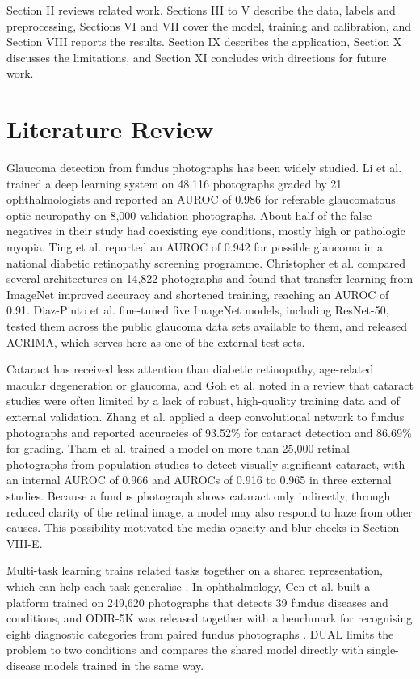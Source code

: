 \documentclass[conference,a4paper]{IEEEtran}
\begin{document}
Section II reviews related work. Sections III to V describe the data, labels and preprocessing,
Sections VI and VII cover the model, training and calibration, and Section VIII reports the results.
Section IX describes the application, Section X discusses the limitations, and Section XI concludes
with directions for future work.

\section{Literature Review}

Glaucoma detection from fundus photographs has been widely studied. Li et al. \cite{ref6} trained a
deep learning system on 48,116 photographs graded by 21 ophthalmologists and reported an AUROC of
0.986 for referable glaucomatous optic neuropathy on 8,000 validation photographs. About half of the
false negatives in their study had coexisting eye conditions, mostly high or pathologic myopia. Ting
et al. \cite{ref5} reported an AUROC of 0.942 for possible glaucoma in a national diabetic
retinopathy screening programme. Christopher et al. \cite{ref11} compared several architectures on
14,822 photographs and found that transfer learning from ImageNet improved accuracy and shortened
training, reaching an AUROC of 0.91. Diaz-Pinto et al. \cite{ref12} fine-tuned five ImageNet models,
including ResNet-50, tested them across the public glaucoma data sets available to them, and
released ACRIMA, which serves here as one of the external test sets.

Cataract has received less attention than diabetic retinopathy, age-related macular degeneration or
glaucoma, and Goh et al. \cite{ref8} noted in a review that cataract studies were often limited by a
lack of robust, high-quality training data and of external validation. Zhang et al. \cite{ref13}
applied a deep convolutional network to fundus photographs and reported accuracies of 93.52\% for
cataract detection and 86.69\% for grading. Tham et al. \cite{ref2} trained a model on more than
25,000 retinal photographs from population studies to detect visually significant cataract, with an
internal AUROC of 0.966 and AUROCs of 0.916 to 0.965 in three external studies. Because a fundus
photograph shows cataract only indirectly, through reduced clarity of the retinal image, a model may
also respond to haze from other causes. This possibility motivated the media-opacity and blur checks
in Section VIII-E.

Multi-task learning trains related tasks together on a shared representation, which can help each
task generalise \cite{ref14}. In ophthalmology, Cen et al. \cite{ref15} built a platform trained on
249,620 photographs that detects 39 fundus diseases and conditions, and ODIR-5K was released
together with a benchmark for recognising eight diagnostic categories from paired fundus photographs
\cite{ref16}. DUAL limits the problem to two conditions and compares the shared model directly with
single-disease models trained in the same way.
\end{document}
